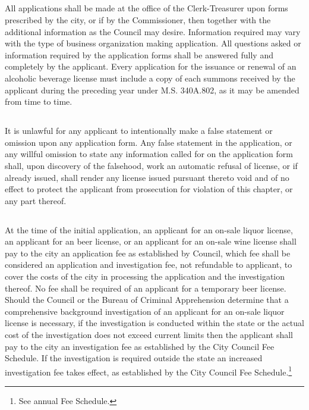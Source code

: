\subsection{}
All applications shall be made at the office of the Clerk-Treasurer upon forms prescribed by the city, or if by the Commissioner, then together with the additional information as the Council may desire. Information required may vary with the type of business organization making application. All questions asked or information required by the application forms shall be answered fully and completely by the applicant. Every application for the issuance or renewal of an alcoholic beverage license must include a copy of each summons received by the applicant during the preceding year under M.S. \textsection 340A.802, as it may be amended from time to time.
\subsection{}
It is unlawful for any applicant to intentionally make a false statement or omission upon any application form. Any false statement in the application, or any willful omission to state any information called for on the application form shall, upon discovery of the falsehood, work an automatic refusal of license, or if already issued, shall render any license issued pursuant thereto void and of no effect to protect the applicant from prosecution for violation of this chapter, or any part thereof.
\subsection{}
At the time of the initial application, an applicant for an on-sale liquor license, an applicant for an beer license, or an applicant for an on-sale wine license shall pay to the city an application fee as established by Council, which fee shall be considered an application and investigation fee, not refundable to applicant, to cover the costs of the city in processing the application and the investigation thereof. No fee shall be required of an applicant for a temporary beer license. Should the Council or the Bureau of Criminal Apprehension determine that a comprehensive background investigation of an applicant for an on-sale liquor license is necessary, if the investigation is conducted within the state or the actual cost of the investigation does not exceed current limits then the applicant shall pay to the city an investigation fee as established by the City Council Fee Schedule. If the investigation is required outside the state an increased investigation fee takes effect, as established by the City Council Fee Schedule.\footnote{See annual Fee Schedule.}


